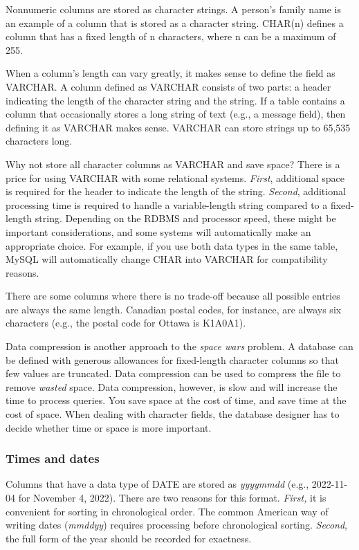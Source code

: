 \documentclass[
]{article}
\begin{document}
Nonnumeric columns are stored as character strings. A person's family
name is an example of a column that is stored as a character string.
CHAR(n) defines a column that has a fixed length of n characters, where
n can be a maximum of 255.

When a column's length can vary greatly, it makes sense to define the
field as VARCHAR. A column defined as VARCHAR consists of two parts: a
header indicating the length of the character string and the string. If
a table contains a column that occasionally stores a long string of text
(e.g., a message field), then defining it as VARCHAR makes sense.
VARCHAR can store strings up to 65,535 characters long.

Why not store all character columns as VARCHAR and save space? There is
a price for using VARCHAR with some relational systems. \emph{First},
additional space is required for the header to indicate the length of
the string. \emph{Second}, additional processing time is required to
handle a variable-length string compared to a fixed-length string.
Depending on the RDBMS and processor speed, these might be important
considerations, and some systems will automatically make an appropriate
choice. For example, if you use both data types in the same table, MySQL
will automatically change CHAR into VARCHAR for compatibility reasons.

There are some columns where there is no trade-off because all possible
entries are always the same length. Canadian postal codes, for instance,
are always six characters (e.g., the postal code for Ottawa is K1A0A1).

Data compression is another approach to the \emph{space wars} problem. A
database can be defined with generous allowances for fixed-length
character columns so that few values are truncated. Data compression can
be used to compress the file to remove \emph{wasted} space. Data
compression, however, is slow and will increase the time to process
queries. You save space at the cost of time, and save time at the cost
of space. When dealing with character fields, the database designer has
to decide whether time or space is more important.

\hypertarget{times-and-dates}{%
\subsubsection*{Times and dates}\label{times-and-dates}}

Columns that have a data type of DATE are stored as \emph{yyyymmdd}
(e.g., 2022-11-04 for November 4, 2022). There are two reasons for this
format. \emph{First,} it is convenient for sorting in chronological
order. The common American way of writing dates (\emph{mmddyy}) requires
processing before chronological sorting. \emph{Second}, the full form of
the year should be recorded for exactness.
\end{document}
